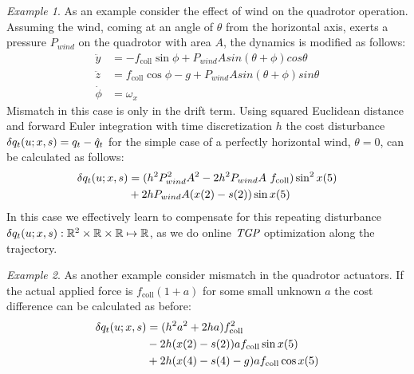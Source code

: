 \textit{Example 1}. As an example consider the effect of wind on the quadrotor operation. Assuming the wind, coming at an angle of $\theta$ from the horizontal axis, exerts a pressure $P_{wind}$ on the quadrotor with area $A$, the dynamics is modified as follows: 
\begin{equation}
\begin{aligned}
\ddot{y} &= -f_{\mathrm{coll}} \sin\phi + P_{wind} A sin(\theta + \phi) cos \theta \\
\ddot{z} &=  f_{\mathrm{coll}}\cos\phi - g + P_{wind} A sin(\theta + \phi) sin \theta \\
\dot{\phi} &= \omega_{x}
\end{aligned}
\label{windDisturbance}
\end{equation}
Mismatch in this case is only in the drift term.  Using squared Euclidean distance and forward Euler integration with time discretization $h$ the cost disturbance $\delta q_{t}(u;x,s) = q_t - \hat{q}_t$ for the simple case of a perfectly horizontal wind, $\theta = 0$, can be calculated as follows:
\begin{equation}
\begin{aligned}
\delta q_{t}(u;x,s) &= (h^{2}P_{wind}^{2}A^{2} - 2h^{2}P_{wind}A\ f_{\mathrm{coll}}) \sin^{2} x(5) \\
&+ 2hP_{wind}A(x(2) - s(2))\sin x(5)
\end{aligned}
\label{QuadTheta0}
\end{equation}
In this case we effectively learn to compensate for this repeating disturbance $\delta q_{t}(u;x,s): \mathbb{R}^{2} \times \mathbb{R} \times \mathbb{R} \mapsto \mathbb{R}$, as we do online $\emph{TGP}$ optimization along the trajectory.

\textit{Example 2}. As another example consider mismatch in the quadrotor actuators. If the actual applied force is $f_{\mathrm{coll}}(1+a)$ for some small unknown $a$ the cost difference can be calculated as before:
\begin{equation}
\begin{aligned}
\delta q_{t}(u;x,s) &= (h^{2}a^{2} + 2ha)f_{\mathrm{coll}}^{2} \\ 
&- 2h(x(2) - s(2))a f_{\mathrm{coll}}\sin x(5) \\
&+ 2h(x(4) - s(4) - g)a f_{\mathrm{coll}} \cos x(5)
\end{aligned}
\label{f_collMismatch}
\end{equation}
